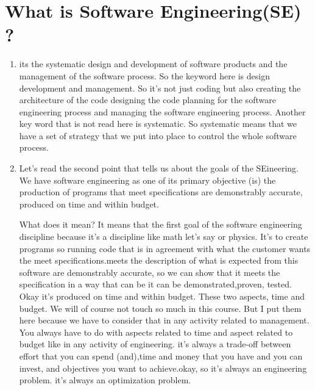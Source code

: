 \documentclass[conference, compsoc, twoside]{IEEEtran}
\begin{document}
\section{What is Software Engineering(SE) ?} %
\begin{enumerate}
	So first of all what is software engineering ? We can read this slide, and then we see
	\item its the systematic design and development of software products and the management of the software process. So the keyword here is design development and management. So it's not just coding but also creating the architecture of the code designing the code planning for the software engineering process and managing the software engineering process. Another key word that is not read here is systematic. So systematic means that we have a set of strategy that we put into place to control the whole software process.
	\item Let's read the second point that tells us about the goals of the SEineering. 
	We have software engineering as one of its primary objective (is) the production of programs that meet specifications are demonstrably accurate, produced on time and within budget.

	What does it mean? It means that the first goal of the software engineering discipline because it's a discipline like math let's say or physics. It's to create programs so running code that is in agreement with what the customer wants the meet specifications.meets the description of what is expected from this software are demonstrably accurate, so we can show that it meets the specification in a way that can be it can be demonstrated,proven, tested.
	Okay it's produced on time and within budget.
	These two aspects, time and budget. We will of course not touch so much in this course.
	But I put them here because we have to consider that in any activity related to management.
	You always have to do with aspects related to time and aspect related to budget like in any activity of engineering.
	it's always a trade-off between effort that you can spend (and),time and money that you have and you can invest, and objectives you want to achieve.okay, so it's always an engineering problem. it's always an optimization problem.	

\end{enumerate}
\end{document}
